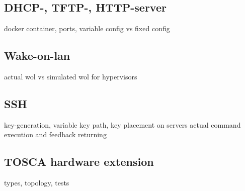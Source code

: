 
\subsection{DHCP-, TFTP-, HTTP-server}
docker container, ports, variable config vs fixed config

\subsection{Wake-on-lan}
actual wol vs simulated wol for hypervisors

\subsection{SSH}
key-generation, variable key path, key placement on servers
\newline
actual command execution and feedback returning

\subsection{TOSCA hardware extension}
types, topology, tests
